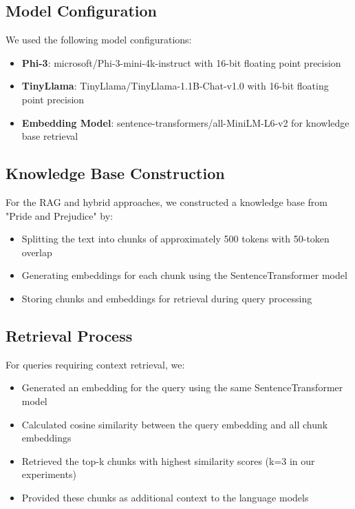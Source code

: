 \documentclass[conference]{IEEEtran}
\begin{document}
\subsection{Model Configuration}
We used the following model configurations:
\begin{itemize}
    \item \textbf{Phi-3}: microsoft/Phi-3-mini-4k-instruct with 16-bit floating point precision
    \item \textbf{TinyLlama}: TinyLlama/TinyLlama-1.1B-Chat-v1.0 with 16-bit floating point precision
    \item \textbf{Embedding Model}: sentence-transformers/all-MiniLM-L6-v2 for knowledge base retrieval
\end{itemize}

\subsection{Knowledge Base Construction}
For the RAG and hybrid approaches, we constructed a knowledge base from "Pride and Prejudice" by:
\begin{itemize}
    \item Splitting the text into chunks of approximately 500 tokens with 50-token overlap
    \item Generating embeddings for each chunk using the SentenceTransformer model
    \item Storing chunks and embeddings for retrieval during query processing
\end{itemize}

\subsection{Retrieval Process}
For queries requiring context retrieval, we:
\begin{itemize}
    \item Generated an embedding for the query using the same SentenceTransformer model
    \item Calculated cosine similarity between the query embedding and all chunk embeddings
    \item Retrieved the top-k chunks with highest similarity scores (k=3 in our experiments)
    \item Provided these chunks as additional context to the language models
\end{itemize}
\end{document}
